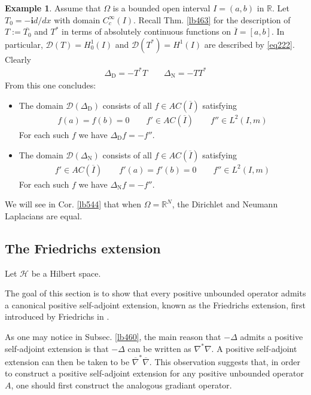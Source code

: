 \documentclass[12pt,b5paper,notitlepage]{article}
\theoremstyle{definition}
\newtheorem{eg}[df]{Example}
\theoremstyle{plain}
\newcommand{\ovl}{\overline}
\newcommand{\Dom}{\mathscr{D}}
\newcommand{\im}{\mathbf{i}}
\newcommand{\Rbb}{\mathbb R}
\newcommand{\MH}{\mathcal H}
\newcommand{\DD}{\Delta_{\mathrm D}}
\newcommand{\DN}{\Delta_{\mathrm N}}
\numberwithin{equation}{section}
\begin{document}
\begin{eg}
Assume that $\Omega$ is a bounded open interval $I=(a,b)$ in $\Rbb$. Let $T_0=-\im d/dx$ with domain $C_c^\infty(I)$. Recall Thm. \ref{lb463} for the description of $T:=\ovl {T_0}$ and $T^*$ in terms of absolutely continuous functions on $\ovl I=[a,b]$. In particular, $\Dom(T)=H_0^1(I)$ and $\Dom(T^*)=H^1(I)$ are described by \eqref{eq222}. Clearly
\begin{align*}
\DD=-T^*T\qquad \DN=-TT^*
\end{align*}
From this one concludes:
\begin{itemize}
\item The domain $\Dom(\DD)$ consists of all $f\in AC(\ovl I)$ satisfying
\begin{align*}
f(a)=f(b)=0\qquad f'\in AC(\ovl I)\qquad f''\in L^2(I,m)
\end{align*}
For each such $f$ we have $\DD f=-f''$.
\item The domain $\Dom(\DN)$ consists of all $f\in AC(\ovl I)$ satisfying
\begin{align*}
f'\in AC(\ovl I)\qquad f'(a)=f'(b)=0\qquad f''\in L^2(I,m)
\end{align*}
For each such $f$ we have $\DN f=-f''$.
\end{itemize}
\end{eg}


We will see in Cor. \ref{lb544} that when $\Omega=\Rbb^N$, the Dirichlet and Neumann Laplacians are equal.





\subsection{The Friedrichs extension}\label{lb465}


Let $\MH$ be a Hilbert space.

The goal of this section is to show that every positive unbounded operator admits a canonical positive self-adjoint extension, known as the Friedrichs extension, first introduced by Friedrichs in \cite{Fri34a}. 

As one may notice in Subsec. \ref{lb460}, the main reason that $-\Delta$ admits a positive self-adjoint extension is that $-\Delta$ can be written as $\nabla^*\nabla$. A positive self-adjoint extension can then be taken to be $\ovl\nabla^*\ovl\nabla$. This observation suggests that, in order to construct a positive self-adjoint extension for any positive unbounded operator $A$, one should first construct the analogous gradiant operator.
\end{document}
